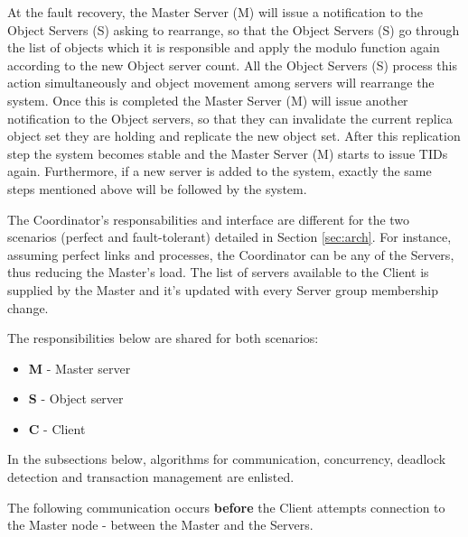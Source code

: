\documentclass[times, 10pt,twocolumn]{article}
\begin{document}
At the fault recovery, the Master Server (M) will issue a notification to the Object Servers (S) asking to rearrange, so that the Object Servers (S) go through the list of objects which it 
is responsible and apply the modulo function again according to the new Object server count. All the Object Servers (S) process this action simultaneously and object movement among servers 
will rearrange the system. Once this is completed the Master Server (M) will issue another notification to the Object servers, so that they can invalidate the current replica object set they 
are holding and replicate the new object set. After this replication step the system becomes stable and the Master Server (M) starts to issue TIDs again. Furthermore, if a new server is added to
the system, exactly the same steps mentioned above will be followed by the system.

\label{subsec:respon}

The Coordinator's responsabilities and interface are different for the two scenarios (perfect and fault-tolerant) detailed in Section \ref{sec:arch}. For instance, assuming perfect links and processes, 
the Coordinator can be any of the Servers, thus reducing the Master's load. The list of servers available to the Client is supplied by the Master and it's updated with every Server group membership change.

The responsibilities below are shared for both scenarios:
\begin{itemize}[noitemsep,nolistsep]
\item {\bf M} - Master server 
\item {\bf S} - Object server
\item {\bf C} - Client      
\end{itemize}

\label{sec:algor}
In the subsections below, algorithms for communication, concurrency, deadlock detection and transaction management are enlisted.

The following communication occurs {\bf before} the Client attempts connection to the Master node - between the Master and the Servers.
\end{document}
